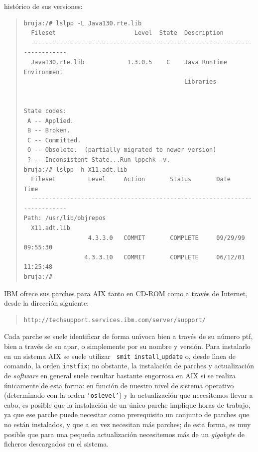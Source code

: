 hist\'orico de sus versiones:
\begin{quote}
\begin{verbatim}
bruja:/# lslpp -L Java130.rte.lib
  Fileset                      Level  State  Description
  --------------------------------------------------------------------------
  Java130.rte.lib            1.3.0.5    C    Java Runtime Environment
                                             Libraries 


State codes: 
 A -- Applied. 
 B -- Broken. 
 C -- Committed. 
 O -- Obsolete.  (partially migrated to newer version) 
 ? -- Inconsistent State...Run lppchk -v. 
bruja:/# lslpp -h X11.adt.lib
  Fileset         Level     Action       Status       Date         Time        
  --------------------------------------------------------------------------
Path: /usr/lib/objrepos
  X11.adt.lib
                  4.3.3.0   COMMIT       COMPLETE     09/29/99     09:55:30    
                 4.3.3.10   COMMIT       COMPLETE     06/12/01     11:25:48    
bruja:/#  
\end{verbatim}
\end{quote}
IBM ofrece sus parches para AIX tanto en CD-ROM como a trav\'es de Internet, 
desde la direcci\'on siguiente:
\begin{quote}
\begin{verbatim}
http://techsupport.services.ibm.com/server/support/
\end{verbatim}
\end{quote}
Cada parche se suele identificar de forma un\'{\i}voca bien a trav\'es de su
n\'umero {\sc ptf}, bien a trav\'es de su {\sc apar}, o simplemente por su
nombre y versi\'on. Para instalarlo en un sistema AIX se suele utilizar {\tt 
smit install$\_$update} o, desde
l\'{\i}nea de comando, la orden {\tt instfix}; no obstante, la instalaci\'on de 
parches y actualizaci\'on de {\it software} en general suele resultar bastante 
engorrosa en AIX si se realiza \'unicamente de esta forma: en funci\'on de 
nuestro nivel de sistema operativo (determinado con la orden {\tt `oslevel'}) y 
la actualizaci\'on que necesitemos llevar a cabo, es posible que la 
instalaci\'on de un \'unico parche implique horas de trabajo, ya que ese parche 
puede
necesitar como prerequisito un conjunto de parches que no est\'an instalados, y
que a su vez necesitan m\'as parches; de esta forma, es muy posible que para
una peque\~na actualizaci\'on necesitemos m\'as de un {\it gigabyte} de ficheros
descargados en el sistema.\\
